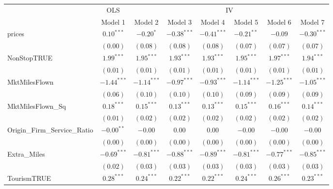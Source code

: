 
\begin{tabular}{l c c c c c c c}
\toprule
 & \multicolumn{1}{c}{OLS} & \multicolumn{6}{c}{IV} \\
\cmidrule(lr){2-2} \cmidrule(lr){3-8}
 & Model 1 & Model 2 & Model 3 & Model 4 & Model 5 & Model 6 & Model 7 \\
\midrule
prices                       & $0.10^{***}$  & $-0.20^{*}$   & $-0.38^{***}$ & $-0.41^{***}$ & $-0.21^{**}$     & $-0.09$       & $-0.30^{***}$  \\
                             & $(0.00)$      & $(0.08)$      & $(0.08)$      & $(0.08)$      & $(0.07)$         & $(0.07)$      & $(0.07)$       \\
NonStopTRUE                  & $1.99^{***}$  & $1.95^{***}$  & $1.93^{***}$  & $1.93^{***}$  & $1.95^{***}$     & $1.97^{***}$  & $1.94^{***}$   \\
                             & $(0.01)$      & $(0.01)$      & $(0.01)$      & $(0.01)$      & $(0.01)$         & $(0.01)$      & $(0.01)$       \\
MktMilesFlown                & $-1.44^{***}$ & $-1.14^{***}$ & $-0.97^{***}$ & $-0.93^{***}$ & $-1.14^{***}$    & $-1.25^{***}$ & $-1.05^{***}$  \\
                             & $(0.06)$      & $(0.10)$      & $(0.10)$      & $(0.10)$      & $(0.09)$         & $(0.09)$      & $(0.09)$       \\
MktMilesFlown\_Sq            & $0.18^{***}$  & $0.15^{***}$  & $0.13^{***}$  & $0.13^{***}$  & $0.15^{***}$     & $0.16^{***}$  & $0.14^{***}$   \\
                             & $(0.01)$      & $(0.02)$      & $(0.02)$      & $(0.02)$      & $(0.02)$         & $(0.02)$      & $(0.02)$       \\
Origin\_Firm\_Service\_Ratio & $-0.00^{**}$  & $-0.00$       & $0.00$        & $0.00$        & $-0.00$          & $-0.00$       & $-0.00$        \\
                             & $(0.00)$      & $(0.00)$      & $(0.00)$      & $(0.00)$      & $(0.00)$         & $(0.00)$      & $(0.00)$       \\
Extra\_Miles                 & $-0.69^{***}$ & $-0.81^{***}$ & $-0.88^{***}$ & $-0.89^{***}$ & $-0.81^{***}$    & $-0.77^{***}$ & $-0.85^{***}$  \\
                             & $(0.02)$      & $(0.03)$      & $(0.03)$      & $(0.03)$      & $(0.03)$         & $(0.03)$      & $(0.03)$       \\
TourismTRUE                  & $0.28^{***}$  & $0.24^{***}$  & $0.22^{***}$  & $0.22^{***}$  & $0.24^{***}$     & $0.26^{***}$  & $0.23^{***}$   \\

\end{tabular}
